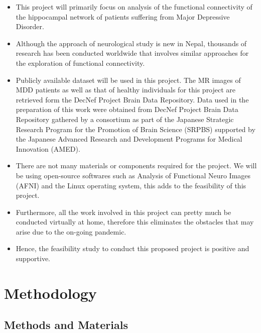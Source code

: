 ﻿\documentclass[12pt]{article}
\begin{document}
\begin{itemize}

  \item This project will primarily focus on analysis of the
    functional connectivity of the hippocampal network of patients
    suffering from Major Depressive Disorder.

  \item  Although the approach of neurological study is new in Nepal,
    thousands of research has been conducted worldwide that involves
    similar approaches for the exploration of functional connectivity.

  \item Publicly available dataset will be used in this project. The
    MR images of MDD patients as well as that of healthy individuals
    for this project are retrieved form the DecNef Project Brain Data
    Repository. Data used in the preparation of this work were
    obtained from DecNef Project Brain Data Repository gathered by
    a consortium as part of the Japanese Strategic Research Program
    for the Promotion of Brain Science (SRPBS) supported by the
    Japanese Advanced Research and Development Programs for Medical
    Innovation (AMED). \textcite{dataset}

  \item There are not many materials or components required for the
    project. We will be using open-source softwares such as Analysis
    of Functional Neuro Images (AFNI) and the Linux operating system,
    this adds to the feasibility of this project.

  \item Furthermore, all the work involved in this project can pretty
    much be conducted virtually at home, therefore this eliminates the
    obstacles that may arise due to the on-going pandemic.

  \item Hence, the feasibility study to conduct this proposed project
    is positive and supportive.

\end{itemize}
\newpage

\section{Methodology}

\subsection{Methods and Materials}
\end{document}
